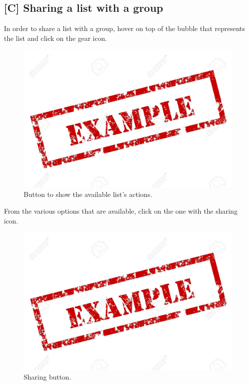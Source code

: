 \subsection{[C] Sharing a list with a group}
In order to share a list with a group, hover on top of the bubble that represents the list and click on the gear icon.

\begin{figure}[H]
  \centering 
  \includegraphics[width=\textwidth]{Sections/3-HowToUse/Images/example.jpeg}
  \caption{Button to show the available list's actions.}
\end{figure}

From the various options that are available, click on the one with the sharing icon.

\begin{figure}[H]
  \centering 
  \includegraphics[width=\textwidth]{Sections/3-HowToUse/Images/example.jpeg}
  \caption{Sharing button.}
\end{figure}

